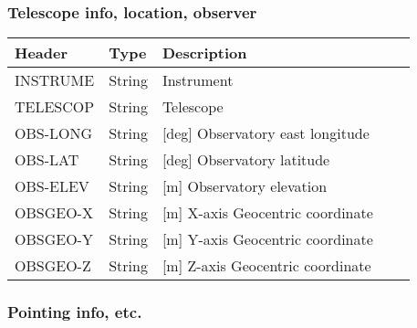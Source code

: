 \subsubsection{Telescope info, location, observer}


\begin{tabular}{l l l l l}
\hline
Header & Type & Description \\
\hline
INSTRUME & String & Instrument \\
TELESCOP & String & Telescope \\
OBS-LONG & String & [deg] Observatory east longitude \\
OBS-LAT & String & [deg] Observatory latitude \\
OBS-ELEV & String & [m] Observatory elevation \\
OBSGEO-X & String & [m] X-axis Geocentric coordinate \\
OBSGEO-Y & String & [m] Y-axis Geocentric coordinate \\
OBSGEO-Z & String & [m] Z-axis Geocentric coordinate \\
\hline
\end{tabular}


\subsubsection{Pointing info, etc.}


